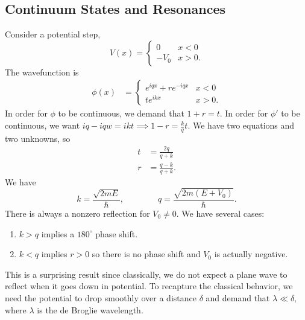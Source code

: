 \documentclass{article}
\numberwithin{equation}{section}
\begin{document}
    \subsection{Continuum States and Resonances}
    Consider a potential step,
    \begin{equation*}
        V(x) = \begin{cases}
            0 & x<0 \\ 
            -V_0 & x>0.
        \end{cases}
    \end{equation*}
    The wavefunction is 
    \begin{align*}
        \phi(x) &= \begin{cases}
            e^{iqx} + re^{-iqx} & x<0 \\ 
            te^{ikx} & x>0.
        \end{cases}
    \end{align*}
    In order for $\phi$ to be continuous, we demand that $1+r=t.$ In order for $\phi'$ to be continuous, we want $iq - iqw = ikt\implies 1-r = \frac{k}{q}t.$ We have two equations and two unknowns, so
    \begin{align*}
        t &= \frac{2q}{q+k} \\ 
        r &= \frac{q-k}{q+k}.
    \end{align*}
    We have 
    \begin{equation*}
        k = \frac{\sqrt{2mE}}{\hbar}, \quad\quad\quad\quad q=\frac{\sqrt{2m(E+V_0)}}{\hbar}.
    \end{equation*}
    There is always a nonzero reflection for $V_0 \neq 0.$ We have several cases:
    \begin{enumerate}[label=(\alph*)]
        \item $k>q$ implies a $180^\circ$ phase shift.
        \item $k<q$ implies $r>0$ so there is no phase shift and $V_0$ is actually negative.
    \end{enumerate}
    This is a surprising result since classically, we do not expect a plane wave to reflect when it goes down in potential. To recapture the classical behavior, we need the potential to drop smoothly over a distance $\delta$ and demand that $\lambda \ll \delta,$ where $\lambda$ is the de Broglie wavelength.
\end{document}
